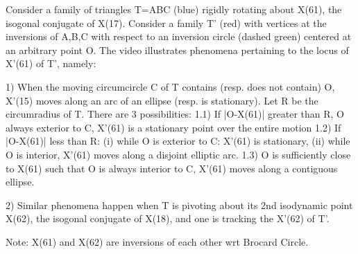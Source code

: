Consider a family of triangles T=ABC (blue) rigidly rotating about X(61), the isogonal conjugate of X(17). Consider a family T' (red) with vertices at the inversions of A,B,C with respect to an inversion circle (dashed green) centered at an arbitrary point O. The video illustrates phenomena pertaining to the locus of X'(61) of T', namely:

1) When the moving circumcircle C of T contains (resp. does not contain) O, X'(15) moves along an arc of an ellipse (resp. is stationary). Let R be the circumradius of T. There are 3 possibilities:
1.1) If |O-X(61)|  greater than R, O always exterior to C, X'(61) is a stationary point over the entire motion
1.2) If |O-X(61)|  less than R: (i) while O is exterior to C: X'(61) is stationary, (ii) while O is interior, X'(61) moves along a disjoint elliptic arc.
1.3) O is sufficiently close to X(61) such that O is always interior to C, X'(61) moves along a contiguous ellipse.

2) Similar phenomena happen when T is pivoting about its 2nd isodynamic point X(62), the isogonal conjugate of X(18), and one is tracking the X'(62) of T'.

Note: X(61) and X(62) are inversions of each other wrt Brocard Circle.